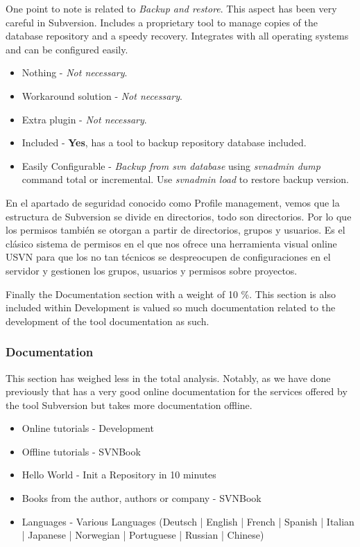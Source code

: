 \documentclass[11pt]{scrartcl}
\begin{document}
\par One point to note is related to \emph{Backup and restore}. This aspect has been very careful in Subversion. Includes a proprietary tool to manage copies of the database repository and a speedy recovery. Integrates with all operating systems and can be configured easily.

\begin{itemize}
    \item Nothing - \emph{Not necessary}.
    \item Workaround solution - \emph{Not necessary}.
    \item Extra plugin - \emph{Not necessary}.
    \item Included - \textbf{Yes}, has a tool to backup repository database included.
    \item Easily Configurable - \emph{Backup from svn database} using \emph{svnadmin dump} command total or incremental. Use \emph{svnadmin load} to restore backup version.
\end{itemize}

\par En el apartado de seguridad conocido como Profile management, vemos que la estructura de Subversion se divide en directorios, todo son directorios. Por lo que los permisos también se otorgan a partir de directorios, grupos y usuarios. Es el clásico sistema de permisos en el que nos ofrece una herramienta visual online USVN para que los no tan técnicos se despreocupen de configuraciones en el servidor y gestionen los grupos, usuarios y permisos sobre proyectos.

\par Finally the Documentation section with a weight of 10 \%. This section is also included within Development is valued so much documentation related to the development of the tool documentation as such.

\subsubsection{Documentation}

\par This section has weighed less in the total analysis. Notably, as we have done previously that has a very good online documentation for the services offered by the tool Subversion but takes more documentation offline.

\begin{itemize}
    \item Online tutorials - Development
    \item Offline tutorials - SVNBook
    \item Hello World - Init a Repository in 10 minutes
    \item Books from the author, authors or company - SVNBook
    \item Languages - Various Languages (Deutsch | English | French | Spanish | Italian | Japanese | Norwegian | Portuguese | Russian | Chinese)
\end{itemize}
\end{document}

